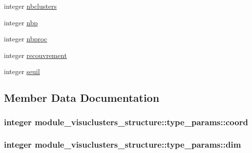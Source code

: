 \begin{DoxyCompactItemize}
\item 
integer \hyperlink{structmodule__visuclusters__structure_1_1type__params_ad24a003143b6a72be056d77eae9a2757}{nbclusters}
\item 
integer \hyperlink{structmodule__visuclusters__structure_1_1type__params_a8b78bd72af8bdabd21acfd6f2314e6dc}{nbp}
\item 
integer \hyperlink{structmodule__visuclusters__structure_1_1type__params_a6b5bc9580c4cc5ddac09f70e87b9affe}{nbproc}
\item 
integer \hyperlink{structmodule__visuclusters__structure_1_1type__params_aeefa371e1a8a47cb214715ae2e67627f}{recouvrement}
\item 
integer \hyperlink{structmodule__visuclusters__structure_1_1type__params_a3cd977202ff5db7cd0db292d654aa68f}{seuil}
\end{DoxyCompactItemize}


\subsection{Member Data Documentation}
\hypertarget{structmodule__visuclusters__structure_1_1type__params_a34c16c92c7d1386a2044ce3600ce1c49}{}
\subsubsection[{coord}]{\setlength{\rightskip}{0pt plus 5cm}integer module\+\_\+visuclusters\+\_\+structure\+::type\+\_\+params\+::coord}\label{structmodule__visuclusters__structure_1_1type__params_a34c16c92c7d1386a2044ce3600ce1c49}
\hypertarget{structmodule__visuclusters__structure_1_1type__params_a3362eae2ef386fcab58bc168e673b227}{}
\subsubsection[{dim}]{\setlength{\rightskip}{0pt plus 5cm}integer module\+\_\+visuclusters\+\_\+structure\+::type\+\_\+params\+::dim}\label{structmodule__visuclusters__structure_1_1type__params_a3362eae2ef386fcab58bc168e673b227}
\hypertarget{structmodule__visuclusters__structure_1_1type__params_a893bedbfe22fca04b088bd7f001ed963}{}
